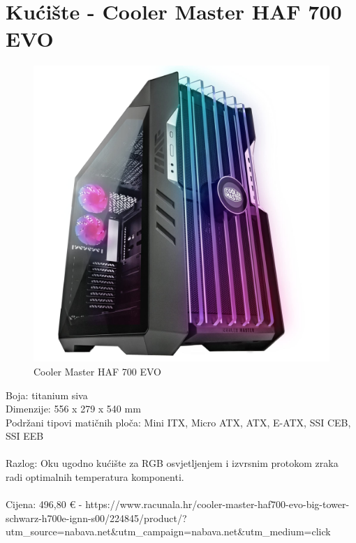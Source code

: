 \documentclass{report}
\begin{document}
\section{Kućište - Cooler Master HAF 700 EVO}
\begin{figure}[H]
    \centering
    \includegraphics[scale=0.1]{Slike/kuciste.jpg}
    \caption{Cooler Master HAF 700 EVO}
    \label{fig:kuciste}
\end{figure}
Boja: titanium siva\\Dimenzije: 556 x 279 x 540 mm\\Podržani tipovi matičnih ploča: Mini ITX, Micro ATX, ATX, E-ATX, SSI CEB, SSI EEB\\\\Razlog: Oku ugodno kućište za RGB osvjetljenjem i izvrsnim protokom zraka radi optimalnih temperatura komponenti.\\\\  Cijena: 496,80 € - https://www.racunala.hr/cooler-master-haf700-evo-big-tower-schwarz-h700e-ignn-s00/224845/product/?utm\_source=nabava.net\&utm\_campaign=nabava.net\&utm\_medium=click

\pagebreak
\end{document}
